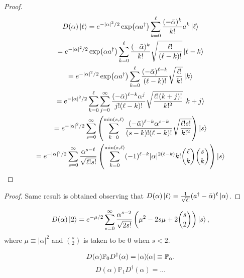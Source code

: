 \documentclass[12pt]{report}
\newcommand{\PP}{\mathbb{P}}
\begin{document}
\begin{proof}
	\begin{equation}
	\begin{gathered}
		D(\alpha) \ket \ell
		= e^{-|\alpha|^2/2}
		\exp(\alpha a^\dagger) 
		\sum_{k=0}^\ell \frac{(-\bar\alpha)^k}{k!} a^k \ket\ell \\
		= e^{-|\alpha|^2/2}
		\exp(\alpha a^\dagger) 
		\sum_{k=0}^\ell \frac{(-\bar\alpha)^k}{k!} \sqrt{\frac{\ell!}{(\ell-k)!}} \ket{\ell-k} \\
		= e^{-|\alpha|^2/2}
		\exp(\alpha a^\dagger) 
		\sum_{k=0}^\ell
		\frac{(-\bar\alpha)^{\ell-k}}{(\ell-k)!} \sqrt{\frac{\ell!}{k!}} \ket{k} \\
		= e^{-|\alpha|^2/2}
		\sum_{k=0}^\ell\sum_{j=0}^\infty
		\frac{(-\bar\alpha)^{\ell-k} \alpha^j}{j!(\ell-k)!} \sqrt{\frac{\ell!(k+j)!}{k!^2}} \ket{k+j} \\
		= e^{-|\alpha|^2/2}
		\sum_{s=0}^\infty \left(
			\sum_{k=0}^{\min(s,\ell)}
			\frac{(-\bar\alpha)^{\ell-k} \alpha^{s-k}}{(s-k)!(\ell-k)!} \sqrt{\frac{\ell!s!}{k!^2}} 
		\right) \ket{s} \\
		= e^{-|\alpha|^2/2}
		\sum_{s=0}^\infty \frac{\alpha^{s-\ell}}{\sqrt{\ell!s!}}
		\left(
		\sum_{k=0}^{\min(s,\ell)}
		(-1)^{\ell-k}|\alpha|^{2(\ell-k)} k!\binom{\ell}{k}\binom{s}{k}
		\right)
		\ket{s} 
	\end{gathered}
	\end{equation}
\end{proof}
\begin{proof}
	Same result is obtained observing that
	$D(\alpha)\ket\ell=\frac{1}{\sqrt{\ell!}}(a^\dagger-\bar\alpha)^\ell \ket\alpha$.
\end{proof}

\begin{example}
	\begin{equation}
		D(\alpha) \ket2
		= e^{-\mu/2} \sum_{s=0}^\infty
		\frac{\alpha^{s-2}}{\sqrt{2 s!}}
		\left(
		\mu^2 -2s \mu + 2\binom{s}{2}
		\right) \ket s,
	\end{equation}
	where $\mu\equiv\lvert\alpha\rvert^2$ and $\binom{s}{2}$ is taken to be $0$ when $s<2$.
\end{example}

\begin{prop}
	\begin{equation}
		D(\alpha)\PP_0 D^\dagger(\alpha) = \ketbra\alpha \equiv \PP_\alpha.
	\end{equation}
	\begin{equation}
		D(\alpha)\PP_1 D^\dagger(\alpha)
		= ...
	\end{equation}
\end{prop}
\end{document}
